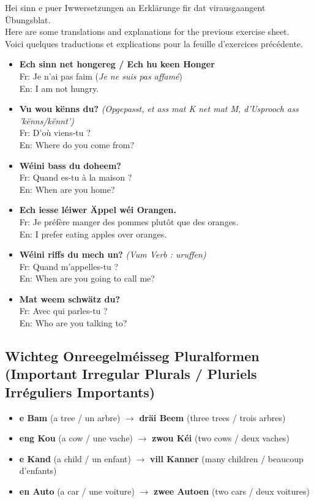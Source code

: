 Hei sinn e puer Iwwersetzungen an Erklärunge fir dat virausgaangent Übungsblat. \\
Here are some translations and explanations for the previous exercise sheet. \\
Voici quelques traductions et explications pour la feuille d'exercices précédente.

\begin{itemize}
    \item \textbf{Ech sinn net hongereg / Ech hu keen Honger} \\
    Fr: Je n'ai pas faim (\textit{Je ne suis pas affamé}) \\
    En: I am not hungry.
    
    \item \textbf{Vu wou kënns du?} \textit{(Opgepasst, et ass mat K net mat M, d'Usprooch ass 'kënns/kënnt')} \\
    Fr: D'où viens-tu ? \\
    En: Where do you come from?
    
    \item \textbf{Wéini bass du doheem?} \\
    Fr: Quand es-tu à la maison ? \\
    En: When are you home?
    
    \item \textbf{Ech iesse léiwer Äppel wéi Orangen.} \\
    Fr: Je préfère manger des pommes plutôt que des oranges. \\
    En: I prefer eating apples over oranges.
    
    \item \textbf{Wéini riffs du mech un?} \textit{(Vum Verb : uruffen)} \\
    Fr: Quand m'appelles-tu ? \\
    En: When are you going to call me?
    
    \item \textbf{Mat weem schwätz du?} \\
    Fr: Avec qui parles-tu ? \\
    En: Who are you talking to?
\end{itemize}

\subsection*{Wichteg Onreegelméisseg Pluralformen (Important Irregular Plurals / Pluriels Irréguliers Importants)}
\begin{itemize}
    \item \textbf{e Bam} (a tree / un arbre) $\rightarrow$ \textbf{dräi Beem} (three trees / trois arbres) 
    \item \textbf{eng Kou} (a cow / une vache) $\rightarrow$ \textbf{zwou Kéi} (two cows / deux vaches)
    \item \textbf{e Kand} (a child / un enfant) $\rightarrow$ \textbf{vill Kanner} (many children / beaucoup d'enfants)
    \item \textbf{en Auto} (a car / une voiture) $\rightarrow$ \textbf{zwee Autoen} (two cars / deux voitures)
\end{itemize}



